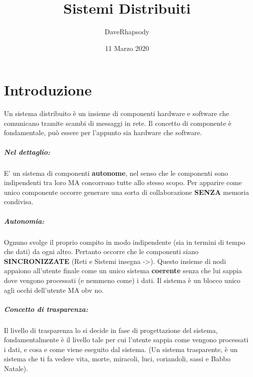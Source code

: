 \documentclass[12pt, a4paper, openany, twoside]{book}
\begin{document}
\selectfont
\pagestyle{plain}
\author{DaveRhapsody}
\title {Sistemi Distribuiti}
\date {11 Marzo 2020}
\maketitle
\tableofcontents
\chapter{Introduzione}
Un sistema distribuito è un insieme di componenti hardware e software che 
comunicano tramite scambi di messaggi in rete.
Il concetto di componente è fondamentale, può essere per l'appunto sia hardware
che software.
\paragraph{Nel dettaglio:} E' un sistema di componenti \textbf{autonome},
nel senso che le componenti sono indipendenti tra loro MA concorrono tutte
allo stesso scopo. Per apparire come unico componente occorre generare una
sorta di collaborazione \textbf{SENZA} memoria condivisa.
\paragraph{Autonomia:} Ognuno svolge il proprio compito in modo indipendente
(sia in termini di tempo che dati) da ogni altro. Pertanto occorre che le
componenti siano \textbf{SINCRONIZZATE} (Reti e Sistemi insegna ->).
Questo insieme di nodi appaiono all'utente finale come un unico sistema
\textbf{coerente} senza che lui sappia dove vengono processati (e nemmeno
come) i dati. Il sistema è un blocco unico agli occhi dell'utente MA obv no.
\paragraph{Concetto di trasparenza:} Il livello di trasparenza lo si decide 
in fase di progettazione del sistema, fondamentalmente è il livello tale per 
cui l'utente sappia come vengono processati i dati, e cosa e come viene
eseguito dal sistema. (Un sistema trasparente, è un sistema che ti fa
vedere vita, morte, miracoli, luci, coriandoli, sassi e Babbo Natale).
\end{document}
